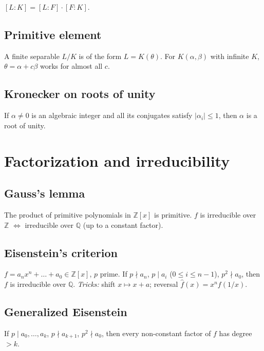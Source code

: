 $[L:K]=[L:F]\cdot[F:K]$.

\subsection{Primitive element}
\label{subsec:primitive-element}

A finite separable $L/K$ is of the form $L=K(\theta)$. For $K(\alpha,\beta)$ with infinite $K$, $\theta=\alpha+c\beta$ works for almost all $c$.

\subsection{Kronecker on roots of unity}
\label{subsec:kronecker-roots}

If $\alpha\ne0$ is an algebraic integer and all its conjugates satisfy $|\alpha_i|\le1$, then $\alpha$ is a root of unity.

\medskip

\section{Factorization and irreducibility}
\label{sec:irreducibility}

\subsection{Gauss's lemma}
\label{subsec:gauss-lemma}

The product of primitive polynomials in $\mathbb{Z}[x]$ is primitive. $f$ is irreducible over $\mathbb{Z}$ $\Leftrightarrow$ irreducible over $\mathbb{Q}$ (up to a constant factor).

\subsection{Eisenstein's criterion}
\label{subsec:eisenstein}

$f=a_nx^n+\dots+a_0\in\mathbb{Z}[x]$, $p$ prime. If $p\nmid a_n$, $p\mid a_i$ ($0\le i\le n-1$), $p^2\nmid a_0$, then $f$ is irreducible over $\mathbb{Q}$.
\textit{Tricks:} shift $x\mapsto x+a$; reversal $\hat f(x)=x^n f(1/x)$.

\subsection{Generalized Eisenstein}
\label{subsec:eisenstein-generalized}

If $p\mid a_0,\dots,a_k$, $p\nmid a_{k+1}$, $p^2\nmid a_0$, then every non-constant factor of $f$ has degree $>k$.

